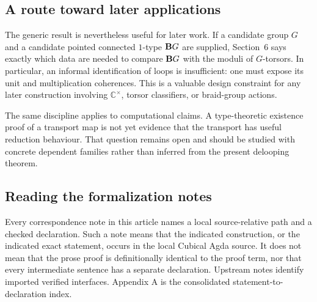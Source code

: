 \subsection{A route toward later applications}
The generic result is nevertheless useful for later work. If a candidate group $G$ and a candidate pointed connected $1$-type $\mathbf{B}G$ are supplied, Section~6 says exactly which data are needed to compare $\mathbf{B}G$ with the moduli of $G$-torsors. In particular, an informal identification of loops is insufficient: one must expose its unit and multiplication coherences. This is a valuable design constraint for any later construction involving $\mathbb{C}^{\times}$, torsor classifiers, or braid-group actions.

\begin{remark}
The same discipline applies to computational claims. A type-theoretic existence proof of a transport map is not yet evidence that the transport has useful reduction behaviour. That question remains open and should be studied with concrete dependent families rather than inferred from the present delooping theorem.
\end{remark}

\subsection{Reading the formalization notes}
Every correspondence note in this article names a local source-relative path and a checked declaration. Such a note means that the indicated construction, or the indicated exact statement, occurs in the local Cubical Agda source. It does not mean that the prose proof is definitionally identical to the proof term, nor that every intermediate sentence has a separate declaration. Upstream notes identify imported verified interfaces. Appendix A is the consolidated statement-to-declaration index.
